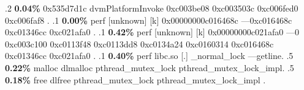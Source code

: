 \begin{profile}
{.2 \textbf{0.04\%} 0x535d7d1c\newline {} dvmPlatformInvoke\newline {} 0xc003be08\newline {} 0xc003503c\newline {} 0xc006fed0\newline {} 0xc006faf8\newline {} . 
.1 \textbf{ 0.00\%} perf             [unknown]              [k] 0x00000000c016468c\newline {} ---0xc016468c\newline {} 0xc01346cc\newline {} 0xc021afa0\newline {} . 
.1 \textbf{ 0.42\%} perf             [unknown]              [k] 0x00000000c021afa0\newline {} ---0\newline {} 0xc003c100\newline {} 0xc0113f48\newline {} 0xc0113dd8\newline {} 0xc0134a24\newline {} 0xc0160314\newline {} 0xc016468c\newline {} 0xc01346cc\newline {} 0xc021afa0\newline {} . 
.1 \textbf{ 0.40\%} perf             libc.so                [.] \_normal\_lock\newline {} ---getline. 
.5 \textbf{0.22\%} malloc\newline {} dlmalloc\newline {} pthread\_mutex\_lock\newline {} pthread\_mutex\_lock\_impl. 
.5 \textbf{0.18\%} free\newline {} dlfree\newline {} pthread\_mutex\_lock\newline {} pthread\_mutex\_lock\_impl\newline {} . 
}
\end{profile}
